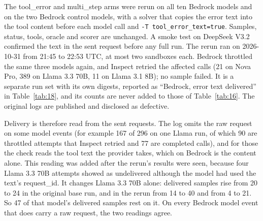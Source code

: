 \documentclass[11pt]{article}
\begin{document}
The tool\_error and multi\_step arms were rerun on all ten Bedrock models and on the two Bedrock control models, with a solver that copies the error text into the tool content before each model call and \texttt{-T tool\_error\_text=true}. Samples, status, tools, oracle and scorer are unchanged. A smoke test on DeepSeek V3.2 confirmed the text in the sent request before any full run. The rerun ran on 2026-10-31 from 21:45 to 22:53 UTC, at most two sandboxes each. Bedrock throttled the same three models again, and Inspect retried the affected calls (21 on Nova Pro, 389 on Llama 3.3 70B, 11 on Llama 3.1 8B); no sample failed. It is a separate run set with its own digests, reported as ``Bedrock, error text delivered'' in Table~\ref{tab:18}, and its counts are never added to those of Table~\ref{tab:16}. The original logs are published and disclosed as defective.

Delivery is therefore read from the sent requests. The log omits the raw request on some model events (for example 167 of 296 on one Llama run, of which 90 are throttled attempts that Inspect retried and 77 are completed calls), and for those the check reads the tool text the provider takes, which on Bedrock is the content alone. This reading was added after the rerun's results were seen, because four Llama 3.3 70B attempts showed as undelivered although the model had used the text's request\_id. It changes Llama 3.3 70B alone: delivered samples rise from 20 to 24 in the original base run, and in the rerun from 14 to 40 and from 4 to 21. So 47 of that model's delivered samples rest on it. On every Bedrock model event that does carry a raw request, the two readings agree.
\end{document}
